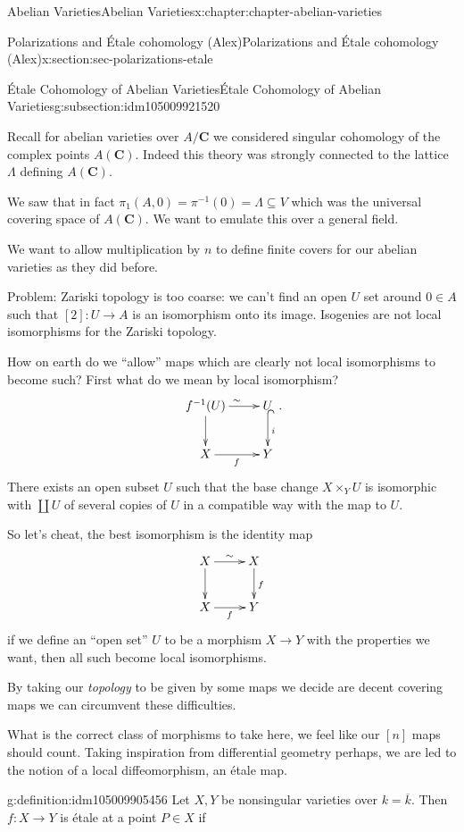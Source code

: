 \documentclass[oneside,10pt,]{book}
\numberwithin{equation}{section}
\newcommand{\lb}{[}
\newcommand{\rb}{]}
\newcommand{\CC}{\mathbf{C}}
\begin{document}
\begin{chapterptx}{Abelian Varieties}{}{Abelian Varieties}{}{}{x:chapter:chapter-abelian-varieties}
\begin{sectionptx}{Polarizations and Étale cohomology (Alex)}{}{Polarizations and Étale cohomology (Alex)}{}{}{x:section:sec-polarizations-etale}
\begin{subsectionptx}{Étale Cohomology of Abelian Varieties}{}{Étale Cohomology of Abelian Varieties}{}{}{g:subsection:idm105009921520}
\par
Recall for abelian varieties over \(A/\CC\) we considered singular cohomology of the complex points \(A(\CC)\). Indeed this theory was strongly connected to the lattice \(\Lambda\) defining \(A(\CC)\).%
\par
We saw that in fact \(\pi_1(A,0) = \pi^{-1} (0) = \Lambda \subseteq V\) which was the universal covering space of \(A(\CC)\). We want to emulate this over a general field.%
\par
We want to allow multiplication by \(n\) to define finite covers for our abelian varieties as they did before.%
\par
Problem: Zariski topology is too coarse: we can't find an open \(U\) set around \(0 \in A\) such that \(\lb 2\rb \colon U \to A\) is an isomorphism onto its image. Isogenies are not local isomorphisms for the Zariski topology.%
\par
How on earth do we ``allow'' maps which are clearly not local isomorphisms to become such? First what do we mean by local isomorphism?%
\begin{equation*}
\xymatrix{
f^{-1}(U)\ar[d] \ar[r]^{\sim} & U\ar@{^(->}[d]^i\\
X \ar[r]_f & Y
}\text{.}
\end{equation*}
There exists an open subset \(U\) such that the base change \(X \times_Y U\) is isomorphic with \(\coprod U\) of several copies of \(U\) in a compatible way with the map to \(U\).%
\par
So let's cheat, the best isomorphism is the identity map%
\begin{equation*}
\xymatrix{
X\ar[d] \ar[r]^{\sim} & X\ar[d]^f\\
X \ar[r]_f & Y
}
\end{equation*}
if we define an ``open set'' \(U\) to be a morphism \(X \to Y\) with the properties we want, then all such become local isomorphisms.%
\par
By taking our \emph{topology} to be given by some maps we decide are decent covering maps we can circumvent these difficulties.%
\par
What is the correct class of morphisms to take here, we feel like our \(\lb n\rb\) maps should count. Taking inspiration from differential geometry perhaps, we are led to the notion of a local diffeomorphism, an étale map.%
\begin{definition}{}{g:definition:idm105009905456}%
Let \(X,Y\) be nonsingular varieties over \(k = \overline k\). Then \(f\colon X\to Y\) is étale at a point \(P\in X\) if%

\end{definition}
\end{subsectionptx}
\end{sectionptx}
\end{chapterptx}
\end{document}
